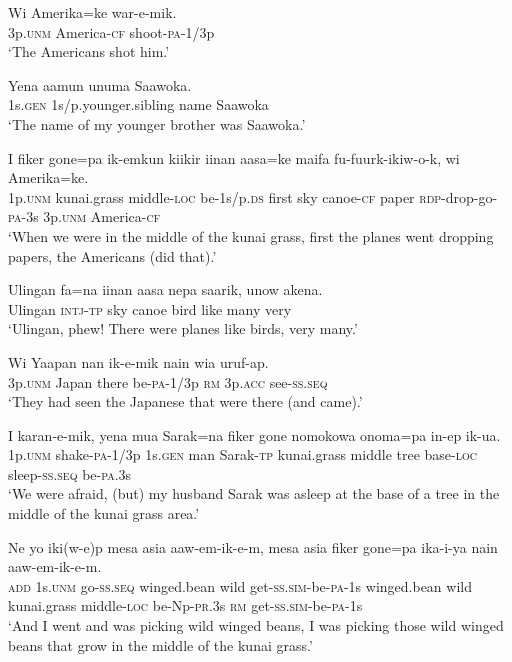 \ea
\gll  Wi  Amerika=ke  war-e-mik. \\
3p.\textsc{unm}  America-\textsc{cf}  shoot-\textsc{pa}-1/3p \\
\glt ‘The Americans shot him.’ \\
\z


\ea
\gll  Yena  aamun  unuma  Saawoka. \\
1s.\textsc{gen}  1s/p.younger.sibling  name  Saawoka \\
\glt ‘The name of my younger brother was Saawoka.’ \\
\z

\largerpage
\ea
\gll  I  fiker  gone=pa  ik-emkun  kiikir  iinan  aasa=ke maifa  fu-fuurk-ikiw-o-k,  wi  Amerika=ke. \\
1p.\textsc{unm}  kunai.grass  middle-\textsc{loc}  be-1s/p.\textsc{ds}  first  sky  canoe-\textsc{cf} paper  \textsc{rdp}-drop-go-\textsc{pa}-3s  3p.\textsc{unm}  America-\textsc{cf} \\
\glt ‘When we were in the middle of the kunai grass, first the planes went dropping papers, the Americans (did that).’ \\
\z


\ea
\gll  Ulingan  fa=na  iinan  aasa  nepa  saarik,  unow  akena. \\
Ulingan  \textsc{intj}-\textsc{tp}  sky  canoe  bird  like  many  very \\
\glt ‘Ulingan, phew! There were planes like birds, very many.’ \\
\z


\ea
\gll  Wi  Yaapan  nan  ik-e-mik  nain  wia  uruf-ap. \\
3p.\textsc{unm}  Japan  there  be-\textsc{pa}-1/3p  \textsc{rm}  3p.\textsc{acc}  see-\textsc{ss.seq} \\
\glt ‘They had seen the Japanese that were there (and came).’ \\
\z


\ea
\gll  I  karan-e-mik,  yena  mua  Sarak=na  fiker  gone  nomokowa  onoma=pa  in-ep  ik-ua. \\
1p.\textsc{unm}  shake-\textsc{pa}-1/3p  1s.\textsc{gen}  man  Sarak-\textsc{tp}  kunai.grass middle  tree  base-\textsc{loc}  sleep-\textsc{ss.seq}  be-\textsc{pa}.3s \\
\glt ‘We were afraid, (but) my husband Sarak was asleep at the base of a tree in the middle of the kunai grass area.’ \\
\z


\ea
\gll  Ne  yo  iki(w-e)p  mesa  asia  aaw-em-ik-e-m, mesa  asia  fiker  gone=pa  ika-i-ya  nain  aaw-em-ik-e-m. \\
\textsc{add}  1s.\textsc{unm}  go-\textsc{ss.seq}  winged.bean  wild  get-\textsc{ss}.\textsc{sim}-be-\textsc{pa}-1s winged.bean  wild  kunai.grass  middle-\textsc{loc}  be-Np-\textsc{pr}.3s  \textsc{rm} get-\textsc{ss}.\textsc{sim}-be-\textsc{pa}-1s\\ 
\glt ‘And I went and was picking wild winged beans, I was picking those wild winged beans that grow in the middle of the kunai grass.’ \\
\z


